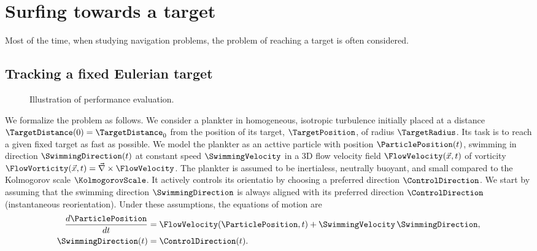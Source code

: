 \chapter{Surfing towards a target}

Most of the time, when studying navigation problems, the problem of reaching a target is often considered.

\section{Tracking a fixed Eulerian target}

\begin{wrapfigure}{L}{0.3\textwidth}
	\centering
	\def\svgwidth{0.3\textwidth}
	
  	\caption{Illustration of performance evaluation.}
\end{wrapfigure}
We formalize the problem as follows. We consider a plankter in homogeneous, isotropic turbulence initially placed at a distance $\TargetDistance(0) = \TargetDistance_0$ from the position of its target, $\TargetPosition$, of radius $\TargetRadius$. Its task is to reach a given fixed target as fast as possible. We model the plankter as an acttive particle with position $\ParticlePosition(t)$, swimming in direction $\SwimmingDirection(t)$ at constant speed $\SwimmingVelocity$ in a 3D flow velocity field $\FlowVelocity(\vec{x}, t)$ of vorticity $\FlowVorticity(\vec{x}, t) = \vec{\nabla} \times \FlowVelocity$. The plankter is assumed to be inertialess, neutrally buoyant, and small compared to the Kolmogorov scale $\KolmogorovScale$. It actively controls its orientatio by choosing a preferred direction $\ControlDirection$. We start by assuming that the swimming direction $\SwimmingDirection$ is always aligned with its preferred direction $\ControlDirection$ (instantaneous reorientation). Under these assumptions, the equations of motion are
\begin{subequations}\label{eq:surfing_motion}
	\begin{align}
		\frac{d \ParticlePosition}{dt} & =
		 \FlowVelocity (\ParticlePosition, t) + \SwimmingVelocity \, \SwimmingDirection, \label{eq:surfing_x_motion}\\
		\SwimmingDirection(t) & = \ControlDirection(t) .\label{eq:surfing_p_motion}
	\end{align}
\end{subequations}

